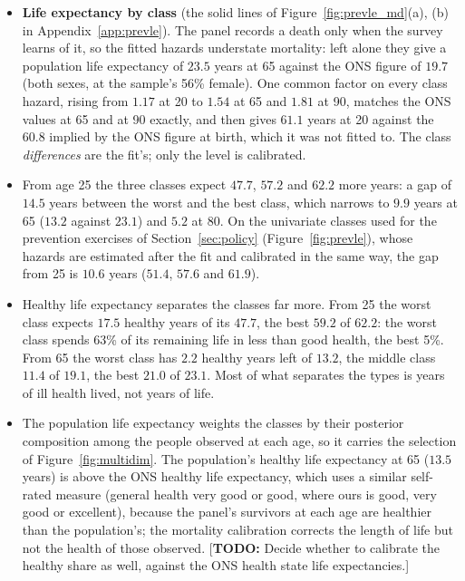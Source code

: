 \documentclass[11pt]{article}
\newcommand{\todo}[1]{\textcolor{red!75!black}{[\textbf{TODO:} #1]}}
\begin{document}
	


	\begin{itemize}
		\item \textbf{Life expectancy by class} (the solid lines of Figure~\ref{fig:prevle_md}(a), (b) in Appendix~\ref{app:prevle}). The panel records a death only when the survey learns of it, so the fitted hazards understate mortality: left alone they give a population life expectancy of $23.5$ years at 65 against the ONS figure of $19.7$ (both sexes, at the sample's 56\% female). One common factor on every class hazard, rising from $1.17$ at 20 to $1.54$ at 65 and $1.81$ at 90, matches the ONS values at 65 and at 90 exactly, and then gives $61.1$ years at 20 against the $60.8$ implied by the ONS figure at birth, which it was not fitted to. The class \emph{differences} are the fit's; only the level is calibrated.
		\item From age 25 the three classes expect $47.7$, $57.2$ and $62.2$ more years: a gap of $14.5$ years between the worst and the best class, which narrows to $9.9$ years at 65 ($13.2$ against $23.1$) and $5.2$ at 80. On the univariate classes used for the prevention exercises of Section~\ref{sec:policy} (Figure~\ref{fig:prevle}), whose hazards are estimated after the fit and calibrated in the same way, the gap from 25 is $10.6$ years ($51.4$, $57.6$ and $61.9$).
		\item Healthy life expectancy separates the classes far more. From 25 the worst class expects $17.5$ healthy years of its $47.7$, the best $59.2$ of $62.2$: the worst class spends 63\% of its remaining life in less than good health, the best 5\%. From 65 the worst class has $2.2$ healthy years left of $13.2$, the middle class $11.4$ of $19.1$, the best $21.0$ of $23.1$. Most of what separates the types is years of ill health lived, not years of life.
		\item The population life expectancy weights the classes by their posterior composition among the people observed at each age, so it carries the selection of Figure~\ref{fig:multidim}. The population's healthy life expectancy at 65 ($13.5$ years) is above the ONS healthy life expectancy, which uses a similar self-rated measure (general health very good or good, where ours is good, very good or excellent), because the panel's survivors at each age are healthier than the population's; the mortality calibration corrects the length of life but not the health of those observed. \todo{Decide whether to calibrate the healthy share as well, against the ONS health state life expectancies.}
	\end{itemize}
\end{document}
